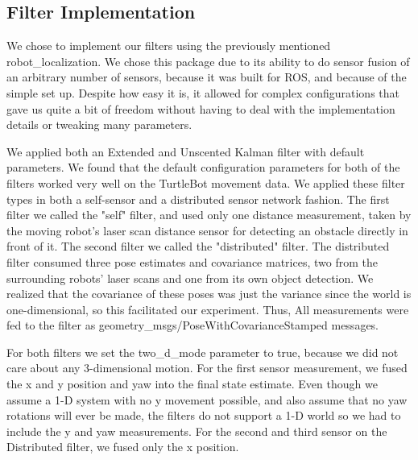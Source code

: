 \documentclass[conference]{IEEEtran} \usepackage[T1]{fontenc} \usepackage[backend=biber, style=ieee]{biblatex}
\begin{document}
\subsection{Filter Implementation} \label{Filter Implementation} We chose to implement our filters using the previously
mentioned robot\_localization. We chose this package due to its ability to do sensor fusion of an arbitrary number of
sensors, because it was built for ROS, and because of the simple set up. Despite how easy it is, it allowed for complex configurations 
that gave us quite a bit of freedom without having to deal with the implementation details or tweaking many parameters.  

We applied both an Extended and Unscented Kalman filter with default parameters. We found that the default configuration 
parameters for both of the filters worked very well on the TurtleBot movement data. We applied these filter types in both
a self-sensor and a distributed sensor network fashion. The first filter we called the "self" filter, and
used only one distance measurement, taken by the moving robot's laser scan distance sensor for detecting an obstacle directly in front 
of it. The second filter we called the "distributed" filter. The distributed filter consumed three pose estimates and covariance matrices, 
two from the surrounding robots' laser scans and one from its own object detection. We realized that the covariance of these poses was just 
the variance since the world is one-dimensional, so this facilitated our experiment. Thus,  All measurements were fed to the filter as geometry\_msgs/PoseWithCovarianceStamped messages.

For both filters we set the two\_d\_mode parameter to true, because we did not care about any 3-dimensional motion. For the first
sensor measurement, we fused the x and y position and yaw into the final state estimate. Even though we assume a 1-D
system with no y movement possible, and also assume that no yaw rotations will ever be made, the filters do not support
a 1-D world so we had to include the y and yaw measurements. For the second and third sensor on the Distributed filter,
we fused only the x position.
\end{document}
